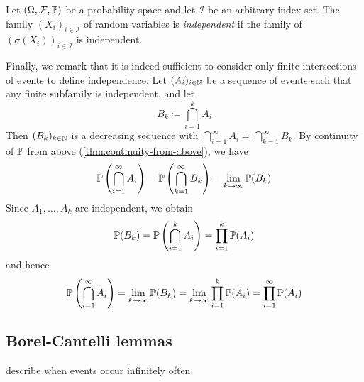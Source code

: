 \begin{definition}
Let $(\Omega, \mathcal{F}, \mathbb{P})$ be a probability space and let $\mathcal{I}$ be an arbitrary index set.
The family $(X_i)_{i \in \mathcal{I}}$ of random variables is \emph{independent} if the family of $(\sigma(X_i))_{i \in \mathcal{I}}$ is independent.
\end{definition}

Finally, we remark that it is indeed sufficient to consider only finite intersections of events to define independence.
Let $(A_i)_{i \in \mathbb{N}}$ be a sequence of events such that any finite subfamily is independent, and let
\[
B_k \coloneq \bigcap_{i=1}^k A_i
\]
Then $(B_k)_{k \in \mathbb{N}}$ is a decreasing sequence with
\(
\bigcap_{i=1}^{\infty} A_i
=
\bigcap_{k=1}^{\infty} B_k
\).
By continuity of $\mathbb{P}$ from above (\autoref{thm:continuity-from-above}), we have
\[
\mathbb{P}\left(\bigcap_{i=1}^{\infty} A_i\right)
=
\mathbb{P}\left(\bigcap_{k=1}^{\infty} B_k\right)
=
\lim_{k \to \infty} \mathbb{P}(B_k)
\]
Since $A_1,\dots,A_k$ are independent, we obtain
\[
\mathbb{P}(B_k)
=
\mathbb{P}\left(\bigcap_{i=1}^k A_i\right)
=
\prod_{i=1}^k \mathbb{P}(A_i)
\]
and hence
\[
\mathbb{P}\left(\bigcap_{i=1}^{\infty} A_i\right)
=
\lim_{k \to \infty} \mathbb{P}(B_k)
=
\lim_{k \to \infty} \prod_{i=1}^k \mathbb{P}(A_i)
=
\prod_{i=1}^{\infty} \mathbb{P}(A_i)
\]



\subsection{Borel-Cantelli lemmas}



describe when events occur infinitely often.

